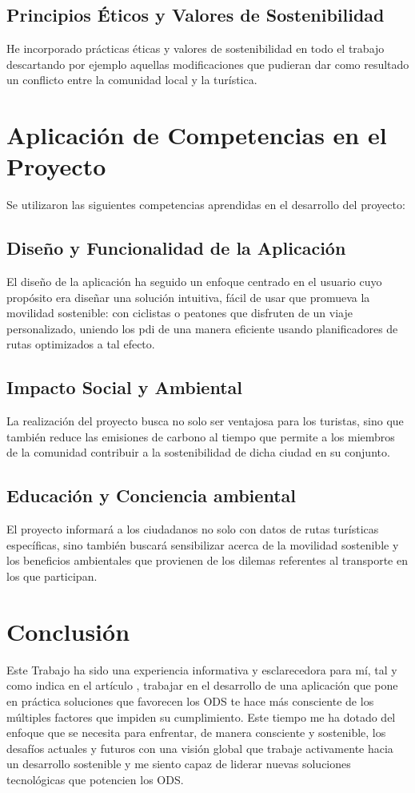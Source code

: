 	\subsection{Principios Éticos y Valores de Sostenibilidad}
	 He incorporado prácticas éticas y valores de sostenibilidad en todo el trabajo descartando por ejemplo aquellas modificaciones que pudieran dar como resultado un conflicto entre la comunidad local y la turística.
				
\section{Aplicación de Competencias en el Proyecto}
				
Se utilizaron las siguientes competencias aprendidas en el desarrollo del proyecto:
	\subsection{Diseño y Funcionalidad de la Aplicación}
						
	El diseño de la aplicación ha seguido un enfoque centrado en el usuario cuyo propósito era diseñar una solución intuitiva, fácil de usar que promueva la movilidad sostenible: con ciclistas o peatones que disfruten de un viaje personalizado, uniendo los \acrfull{pdi} de una manera eficiente usando planificadores de rutas optimizados a tal efecto.
						
	\subsection{Impacto Social y Ambiental}
	La realización del proyecto busca no solo ser ventajosa para los turistas, sino que también reduce las emisiones de carbono al tiempo que permite a los miembros de la comunidad contribuir a la sostenibilidad de dicha ciudad en su conjunto.
							
	\subsection{Educación y Conciencia ambiental}
	El proyecto informará a los ciudadanos no solo con datos de rutas turísticas específicas, sino también buscará sensibilizar acerca de la movilidad sostenible y los beneficios ambientales que provienen de los dilemas referentes al transporte en los que participan.
								
\section {Conclusión}
Este Trabajo ha sido una experiencia informativa y esclarecedora para mí, tal y como indica en el artículo \cite{markiegi}, trabajar en el desarrollo de una aplicación que pone en práctica soluciones que favorecen los ODS te hace más consciente de los múltiples factores que impiden su cumplimiento. Este tiempo me ha dotado del enfoque que se necesita para enfrentar, de manera consciente y sostenible, los desafíos actuales y futuros con una visión global que trabaje activamente hacia un desarrollo sostenible y me siento capaz de liderar nuevas soluciones tecnológicas que potencien los ODS.

